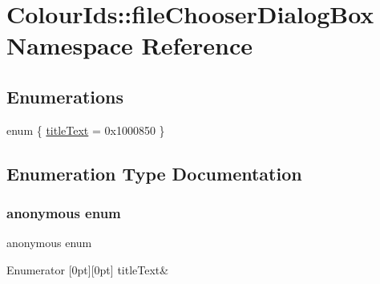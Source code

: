 \hypertarget{namespaceColourIds_1_1fileChooserDialogBox}{}\section{Colour\+Ids\+:\+:file\+Chooser\+Dialog\+Box Namespace Reference}
\label{namespaceColourIds_1_1fileChooserDialogBox}
\subsection*{Enumerations}
\begin{DoxyCompactItemize}
\item 
enum \{ \mbox{\hyperlink{namespaceColourIds_1_1fileChooserDialogBox_a08abb0b60c1adc460bfe8ddc18e93880a9f2a2a46cc8586fc6aed46cadedc15be}{title\+Text}} = 0x1000850
 \}
\end{DoxyCompactItemize}


\subsection{Enumeration Type Documentation}
\mbox{\label{namespaceColourIds_1_1fileChooserDialogBox_a08abb0b60c1adc460bfe8ddc18e93880}} 
\subsubsection{\texorpdfstring{anonymous enum}{anonymous enum}}
{\footnotesize\ttfamily anonymous enum}

\begin{DoxyEnumFields}{Enumerator}
[0pt][0pt]{}\mbox{\label{namespaceColourIds_1_1fileChooserDialogBox_a08abb0b60c1adc460bfe8ddc18e93880a9f2a2a46cc8586fc6aed46cadedc15be}} 
title\+Text&\\
\hline

\end{DoxyEnumFields}
